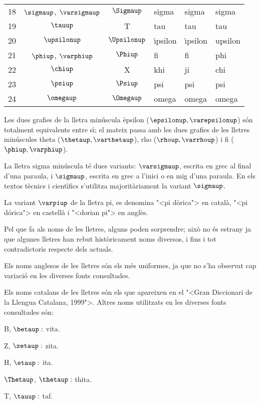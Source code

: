 \begin{table}[h]
\begin{center}
\begin{tabular}{ccclll}
   18 & $\sigmaup$, $\varsigmaup$ & $\Sigmaup$ & sigma & sigma &  sigma\\
   19 & $\tauup$ & T & tau & tau & tau\\
   20 & $\upsilonup$ & $\Upsilonup$ & \'{\i}psilon & \'{\i}psilon &  upsilon\\
   21 & $\phiup$, $\varphiup$ & $\Phiup$ & fi & fi &  phi\\
   22 & $\chiup$ & X & khi & ji &  chi\\
   23 & $\psiup$ & $\Psiup$ & psi & psi &  psi\\
   24 & $\omegaup$ & $\Omegaup$ & omega & omega &  omega\\
   \bottomrule[1pt]
   \end{tabular} \end{center}
\end{table}

Les dues grafies de la lletra min\'{u}scula \`{e}psilon  ($\epsilonup,
\varepsilonup$) s\'{o}n totalment equivalents entre s\'{\i}; el mateix passa
amb les dues grafies de les lletres min\'{u}scules theta ($\thetaup,
\varthetaup$), rho ($\rhoup,\varrhoup$) i fi ($\phiup, \varphiup$).

La lletra sigma min\'{u}scula t\'{e} dues variants: $\varsigmaup$, escrita en
grec al final d'una paraula, i $\sigmaup$, escrita en grec a l'inici o
en mig d'una paraula. En els textos t\`{e}cnics i cient\'{\i}fics s'utilitza
majorit\`{a}riament la variant $\sigmaup$.

La variant $\varpiup$ de la lletra pi, es denomina {"<}pi d\`{o}rica{">} en
catal\`{a}, {"<}pi d\'{o}rica{">} en castell\`{a} i {"<}dorian pi{">} en angl\`{e}s.

Pel que fa als noms de les lletres, alguns poden sorprendre; aix\`{o} no
\'{e}s estrany ja que algunes lletres han rebut hist\`{o}ricament noms
diversos, i fins i tot contradictoris respecte dels actuals.

Els noms anglesos de les lletres s\'{o}n els m\'{e}s uniformes, ja que no
s'ha observat cap variaci\'{o} en les diverses fonts consultades.

Els noms catalans de les lletres s\'{o}n els que apareixen en el {"<}Gran
Diccionari de la Llengua Catalana, 1999{">}. Altres noms utilitzats en
les diverses fonts consultades s\'{o}n:
\begin{multicols}{3}
\begin{list}{}
   {\setlength{\labelwidth}{16mm} \setlength{\leftmargin}{16mm} \setlength{\labelsep}{2mm}}
   \item[B, $\betaup :$] vita.
   \item[Z, $\zetaup :$] zita.
   \item[H, $\etaup :$] ita.
   \item[$\Thetaup$, $\thetaup :$] thita.
   \item[T, $\tauup :$] taf.
\end{list}
\end{multicols}

